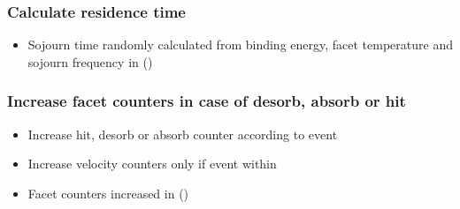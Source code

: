 \subsubsection{Calculate residence time}
\begin{itemize}[noitemsep,topsep=0pt, partopsep=0pt]
\item Sojourn time randomly calculated from binding energy, facet temperature and sojourn frequency in   ()
\end{itemize}

\subsubsection{Increase facet counters in case of desorb, absorb or hit}
\begin{itemize}[noitemsep,topsep=0pt, partopsep=0pt]
\item Increase hit, desorb or absorb counter according to event
\item Increase velocity counters only if event within 
\item Facet counters increased in   ()
\end{itemize}

